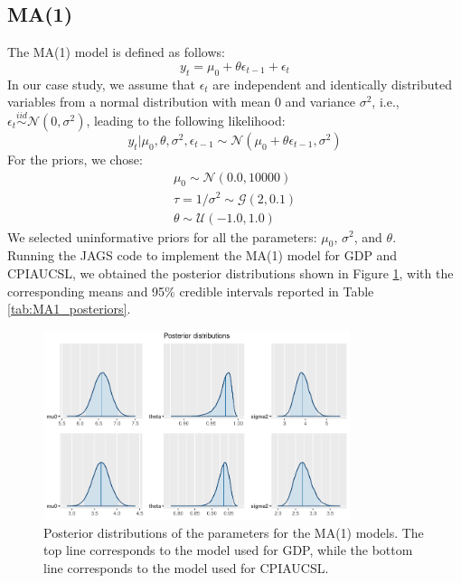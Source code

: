 \subsection*{MA(1)}
The MA(1) model is defined as follows:
\begin{equation}
    \label{eq:MA1}
    y_{t} = \mu_{0} + \theta \epsilon_{t-1} + \epsilon_t
\end{equation}
In our case study, we assume that $\epsilon_t$ are independent and identically distributed variables from a normal distribution with mean $0$ and variance $\sigma^2$, i.e., $\epsilon_t \stackrel{iid}{\sim} \mathcal{N}(0,\sigma^2)$, leading to the following likelihood:
\begin{equation}
    \label{eq:MA1_likelihood}
    y_{t}|\mu_{0},\theta,\sigma^2,\epsilon_{t-1} \sim \mathcal{N}(\mu_{0} + \theta \epsilon_{t-1}, \sigma^2)
\end{equation}
For the priors, we chose:
\begin{equation}
    \label{eq:MA1_priors}
    \begin{split}
        \mu_0 \sim \mathcal{N}(0.0, 10000) \\
        \tau = 1 / \sigma^2 \sim \mathcal{G}(2, 0.1) \\
        \theta \sim \mathcal{U}(-1.0, 1.0)
    \end{split}
\end{equation}
We selected uninformative priors for all the parameters: $\mu_{0}$, $\sigma^2$, and $\theta$. \\
Running the JAGS code to implement the MA(1) model for GDP and CPIAUCSL, we obtained the posterior distributions shown in Figure \ref{fig:MA1_posteriors}, with the corresponding means and 95\% credible intervals reported in Table \ref{tab:MA1_posteriors}. \\
\begin{figure}[h]
    \centering
    \includegraphics[width=0.8\textwidth]{images/3-MA/posteriors.png}
    \caption{Posterior distributions of the parameters for the MA(1) models. The top line corresponds to the model used for GDP, while the bottom line corresponds to the model used for CPIAUCSL.}
    \label{fig:MA1_posteriors}
\end{figure}
